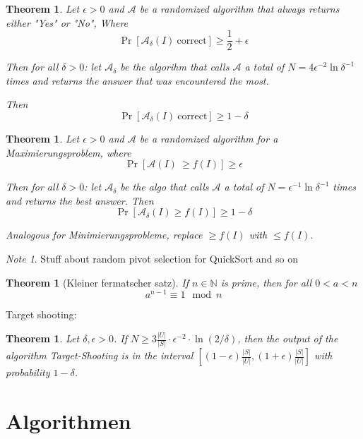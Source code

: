 \documentclass[12pt]{extarticle}
\theoremstyle{definition}
\theoremstyle{remark}
\newtheorem{note}[definition]{Note}
\theoremstyle{plain}
\newtheorem{theorem}[definition]{Theorem}
\theoremstyle{plain}
\theoremstyle{plain}
\begin{document}
\begin{theorem}
    Let $\epsilon > 0$ and $\mathcal{A}$ be a randomized algorithm that always returns either "Yes" or "No",
    Where
    \[ \Pr[\mathcal{A}_\delta(I)\ \mbox{correct}] \ge \frac{1}{2} + \epsilon \]

    Then for all $\delta > 0$:
    let $\mathcal{A}_\delta$ be the algorihm that calls $\mathcal{A}$ a total of $N = 4 \epsilon^{-2} \ln \delta^{-1}$ times
    and returns the answer that was encountered the most.

    Then
    \[ \Pr[\mathcal{A}_\delta(I) \ \mbox{correct}] \ge 1 - \delta \]
\end{theorem}

\begin{theorem}
    Let $\epsilon > 0$ and $\mathcal{A}$ be a randomized algorithm for a \textit{Maximierungsproblem}, where
    \[ \Pr[\mathcal{A}(I)\ \ge f(I)] \ge \epsilon  \]

    Then for all $\delta > 0$:
    let $\mathcal{A}_\delta$ be the algo that calls $\mathcal{A}$ a total of $N = \epsilon^{-1} \ln \delta^{-1}$ times
    and returns the best answer. Then
    \[ \Pr[\mathcal{A}_\delta(I) \ge f(I)] \ge 1 - \delta \]

    Analogous for \textit{Minimierungsprobleme}, replace $\ge f(I)$ with $\le f(I)$.
\end{theorem}

\begin{note}
    Stuff about random pivot selection for QuickSort and so on
\end{note}

\begin{theorem}[Kleiner fermatscher satz]
    If $n \in \mathbb{N}$ is prime, then for all $0 < a < n$
    \[ a^{n - 1} \equiv 1 \mod n \]
\end{theorem}


Target shooting:

\begin{theorem}
    Let $\delta,\epsilon > 0$. If $N \ge 3 \frac{|U|}{|S|} \cdot \epsilon^{-2} \cdot \ln(2 / \delta)$, then
    the output of the algorithm Target-Shooting is in the interval $\left[ (1-\epsilon)\frac{|S|}{|U|},(1+\epsilon)\frac{|S|}{|U|} \right]$
    with probability $1 - \delta$.
\end{theorem}

\section{Algorithmen}
\end{document}
